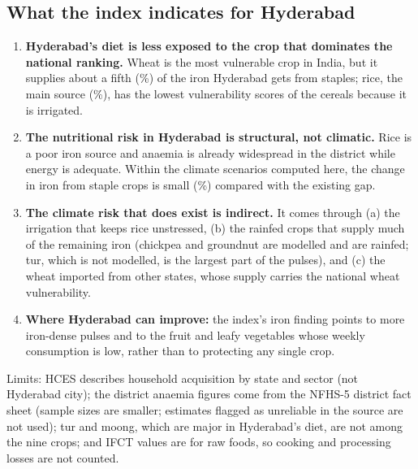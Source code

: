 \subsection{What the index indicates for Hyderabad}
\begin{enumerate}
\item \textbf{Hyderabad's diet is less exposed to the crop that dominates the national ranking.} Wheat is the
most vulnerable crop in India, but it supplies about a fifth (\hqTgUrbanFeWheat\%) of the iron Hyderabad gets from
staples; rice, the main source (\hqTgUrbanFeRice\%), has the lowest vulnerability scores of the cereals because it
is irrigated.
\item \textbf{The nutritional risk in Hyderabad is structural, not climatic.} Rice is a poor iron source and
anaemia is already widespread in the district while energy is adequate. Within the climate scenarios computed
here, the change in iron from staple crops is small (\hqIronChangeUrban\%) compared with the existing gap.
\item \textbf{The climate risk that does exist is indirect.} It comes through (a) the irrigation that keeps rice
unstressed, (b) the rainfed crops that supply much of the remaining iron (chickpea and groundnut are modelled and are
rainfed; tur, which is not modelled, is the largest part of the pulses), and (c) the wheat imported from other states, whose supply carries
the national wheat vulnerability.
\item \textbf{Where Hyderabad can improve:} the index's iron finding points to more iron-dense pulses
and to the fruit and leafy vegetables whose weekly consumption is low, rather than to protecting any single crop.
\end{enumerate}
Limits: HCES describes household acquisition by state and sector (not Hyderabad city); the district anaemia
figures come from the NFHS-5 district fact sheet (sample sizes are smaller; estimates flagged as unreliable in the
source are not used); tur and moong, which are major in Hyderabad's diet, are not among the nine crops; and
IFCT values are for raw foods, so cooking and processing losses are not counted.
